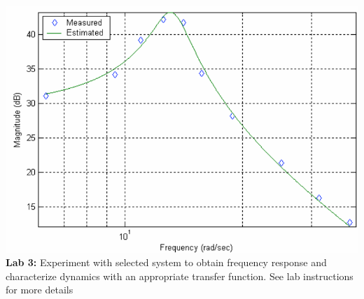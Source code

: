\documentclass[aspectratio=169]{beamer}
\begin{document}
\begin{frame}
\begin{columns}
\begin{column}{0.5\textwidth}
			\includegraphics[width=\textwidth]{Images/sys_char_bode_data.png}
			\footnotesize{
				\textbf{Lab 3:}
				Experiment with selected system to obtain frequency response and characterize dynamics with an appropriate transfer function.
				\tiny{See lab instructions for more details}
				}
		\end{column}
	\end{columns}
\end{frame}

\section*{}
\end{document}
